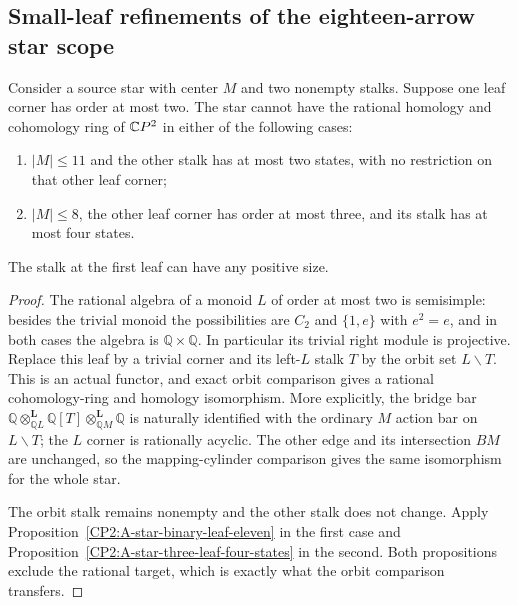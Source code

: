 \subsection{Small-leaf refinements of the eighteen-arrow star scope}

\begin{lemma}
\label{CP2:A-star-small-leaf-orbit-extension}
Consider a source star with center $M$ and two nonempty stalks.
Suppose one leaf corner has order at most two. The star cannot
have the rational homology and cohomology ring of $\mathbb{C}P^2$ in
either of the following cases:
\begin{enumerate}
\item $|M|\leq11$ and the other stalk has at most two states,
with no restriction on that other leaf corner;
\item $|M|\leq8$, the other leaf corner has order at most three,
and its stalk has at most four states.
\end{enumerate}
The stalk at the first leaf can have any positive size.
\end{lemma}
\begin{proof}
The rational algebra of a monoid $L$ of order at most two is
semisimple: besides the trivial monoid the possibilities are
$C_2$ and $\{1,e\}$ with $e^2=e$, and in both cases the
algebra is $\mathbb Q\times\mathbb Q$. In particular its
trivial right module is projective. Replace this leaf by a
trivial corner and its left-$L$ stalk $T$ by the orbit set
$L\backslash T$. This is an actual functor, and exact orbit
comparison gives a rational cohomology-ring and homology
isomorphism. More explicitly, the bridge bar
$\mathbb Q\otimes^{\mathbf L}_{\mathbb QL}\mathbb Q[T]
\otimes^{\mathbf L}_{\mathbb QM}\mathbb Q$ is naturally
identified with the ordinary $M$ action bar on $L\backslash T$;
the $L$ corner is rationally acyclic. The other edge and its
intersection $BM$ are unchanged, so the mapping-cylinder
comparison gives the same isomorphism for the whole star.

The orbit stalk remains nonempty and the other stalk does not
change. Apply Proposition~\ref{CP2:A-star-binary-leaf-eleven}
in the first case and
Proposition~\ref{CP2:A-star-three-leaf-four-states} in the
second. Both propositions exclude the rational target, which
is exactly what the orbit comparison transfers.
\end{proof}

